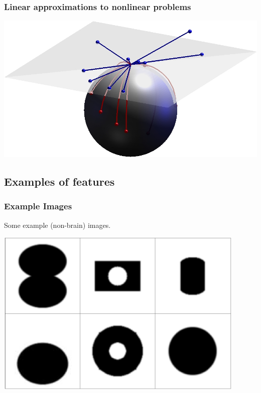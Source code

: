 \documentclass{beamer}
\begin{document}
\begin{frame}
\frametitle{Linear approximations to nonlinear problems}
\begin{center}
\includegraphics[width=1.2\textwidth]{spheres}
\end{center}
\end{frame}


\subsection{Examples of features}
\begin{frame}
\frametitle{Example Images}
Some example (non-brain) images.
\begin{center}
\includegraphics[width=0.9\textwidth]{original}
\end{center}
\end{frame}
\end{document}
